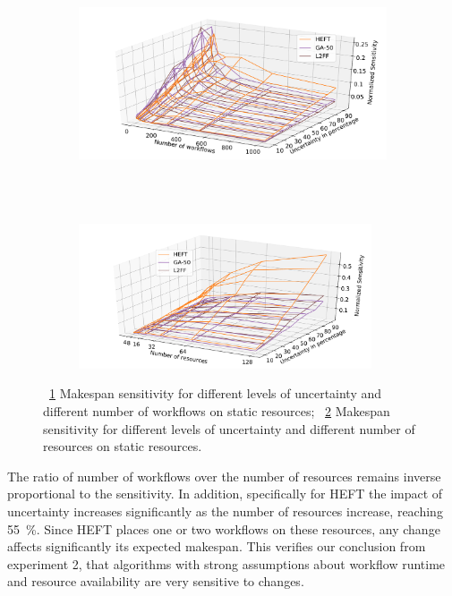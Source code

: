 \begin{figure}[ht!]
    \centering
    \begin{subfigure}[b]{0.95\textwidth}
        \includegraphics[width=.95\textwidth]{figures/campaign/InaccurStHeteroCampaigns_4StHeteroResourcesSens.pdf}
        \caption{}
        \label{fig:InaccurStHeteroCampaigns_4StHeteroResourcesSens}
    \end{subfigure}\\
    ~ 
    \begin{subfigure}[b]{0.95\textwidth}
        \includegraphics[width=0.95\textwidth]{figures/campaign/InaccurStHeteroResources_StHeteroCampaignsSens.pdf}
        \caption{}
        \label{fig:InaccurStHeteroResources_StHeteroCampaignsSens}
    \end{subfigure}
    \caption{~\ref{fig:InaccurStHeteroCampaigns_4StHeteroResourcesSens} Makespan sensitivity for different levels of uncertainty and different number of workflows on static resources;
    ~\ref{fig:InaccurStHeteroResources_StHeteroCampaignsSens} Makespan sensitivity for different levels of uncertainty and different number of resources on static resources.}
    \label{fig:inaccur_st}
\end{figure}

The ratio of number of workflows over the number of resources remains inverse proportional to the sensitivity.
In addition, specifically for HEFT the impact of uncertainty increases significantly as the number of resources increase, reaching 55~\%.
Since HEFT places one or two workflows on these resources, any change affects significantly its expected makespan.
This verifies our conclusion from experiment 2, that algorithms with strong assumptions about workflow runtime and resource availability are very sensitive to changes.

